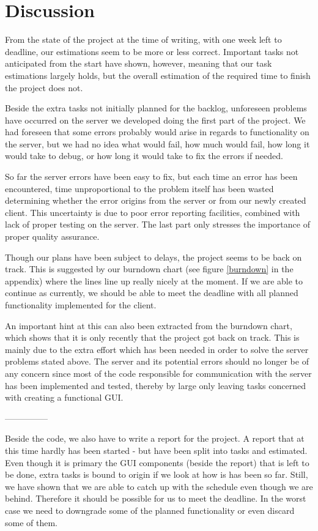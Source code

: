 \section{Discussion}
From the state of the project at the time of writing, with one week left to deadline, our estimations seem to be more or less correct. Important tasks not anticipated from the start have shown, however, meaning that our task estimations largely holds, but the overall estimation of the required time to finish the project does not.

Beside the extra tasks not initially planned for the backlog, unforeseen problems have occurred on the server we developed doing the first part of the project. We had foreseen that some errors probably would arise in regards to functionality on the server, but we had no idea what would fail, how much would fail, how long it would take to debug, or how long it would take to fix the errors if needed.

So far the server errors have been easy to fix, but each time an error has been encountered, time unproportional to the problem itself has been wasted determining whether the error origins from the server or from our newly created client.
This uncertainty is due to poor error reporting facilities, combined with lack of proper testing on the server. The last part only stresses the importance of proper quality assurance.

Though our plans have been subject to delays, the project seems to be back on track. This is suggested by our burndown chart (see figure \ref{burndown} in the appendix) where the lines line up really nicely at the moment. If we are able to continue as currently, we should be able to meet the deadline with all planned functionality implemented for the client.

An important hint at this can also been extracted from the burndown chart, which shows that it is only recently that the project got back on track. This is mainly due to the extra effort which has been needed in order to solve the server problems stated above.
The server and its potential errors should no longer be of any concern since most of the code responsible for communication with the server has been implemented and tested, thereby by large only leaving tasks concerned with creating a functional GUI.

---------------

Beside the code, we also have to write a report for the project. A report that at this time hardly has been started - but have been split into tasks and estimated.
Even though it is primary the GUI components (beside the report) that is left to be done, extra tasks is bound to origin if we look at how is has been so far. Still, we have shown that we are able to catch up with the schedule even though we are behind. Therefore it should be possible for us to meet the deadline. In the worst case we need to downgrade some of the planned functionality or even discard some of them.

